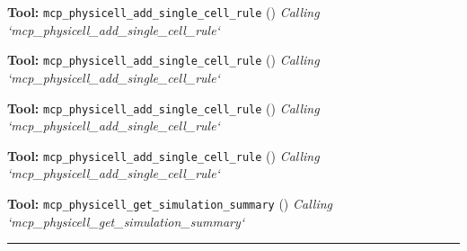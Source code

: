 \documentclass[11pt,a4paper]{article}
\begin{document}
\begin{toolokbox}
\textbf{Tool:} \texttt{mcp\_physicell\_add\_single\_cell\_rule} (\checkmark)
\textit{Calling `mcp\_physicell\_add\_single\_cell\_rule`}
\end{toolokbox}
\begin{toolokbox}
\textbf{Tool:} \texttt{mcp\_physicell\_add\_single\_cell\_rule} (\checkmark)
\textit{Calling `mcp\_physicell\_add\_single\_cell\_rule`}
\end{toolokbox}
\begin{toolokbox}
\textbf{Tool:} \texttt{mcp\_physicell\_add\_single\_cell\_rule} (\checkmark)
\textit{Calling `mcp\_physicell\_add\_single\_cell\_rule`}
\end{toolokbox}
\begin{toolokbox}
\textbf{Tool:} \texttt{mcp\_physicell\_add\_single\_cell\_rule} (\checkmark)
\textit{Calling `mcp\_physicell\_add\_single\_cell\_rule`}
\end{toolokbox}
\begin{toolokbox}
\textbf{Tool:} \texttt{mcp\_physicell\_get\_simulation\_summary} (\checkmark)
\textit{Calling `mcp\_physicell\_get\_simulation\_summary`}
\end{toolokbox}
\bigskip\hrule\bigskip
\end{document}
